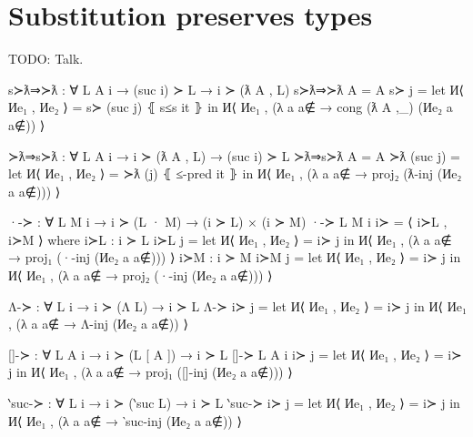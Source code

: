 \documentclass[logo,bsc,singlespacing,parskip,online]{infthesis}
\renewenvironment{code}{\mintedcopy[breaklines,breaksymbolleft=\;]{agda}}{\endmintedcopy}
\begin{document}
\section{Substitution preserves types}
TODO: Talk.
\begin{code}

  s≻ƛ⇒≻ƛ : ∀ {L A i} → (suc i) ≻ L → i ≻ (ƛ A , L)
  s≻ƛ⇒≻ƛ {A = A} s≻ j = let И⟨ Иe₁ , Иe₂ ⟩ = s≻ (suc j) ⦃ s≤s it ⦄
    in И⟨ Иe₁ , (λ a {a∉} → cong (ƛ A ,_) (Иe₂ a {a∉})) ⟩

  ≻ƛ⇒s≻ƛ : ∀ {L A i} → i ≻ (ƛ A , L) → (suc i) ≻ L
  ≻ƛ⇒s≻ƛ {A = A} ≻ƛ (suc j) = let И⟨ Иe₁ , Иe₂ ⟩ = ≻ƛ (j) ⦃ ≤-pred it ⦄
    in И⟨ Иe₁ , (λ a {a∉} → proj₂ (ƛ-inj (Иe₂ a {a∉}))) ⟩

  ·-≻ : ∀ {L M i} → i ≻ (L · M) → (i ≻ L) × (i ≻ M)
  ·-≻ {L} {M} {i} i≻ = ⟨ i≻L , i≻M ⟩
    where
      i≻L : i ≻ L
      i≻L j = let И⟨ Иe₁ , Иe₂ ⟩ = i≻ j
        in И⟨ Иe₁ , (λ a {a∉} → proj₁ (·-inj (Иe₂ a {a∉}))) ⟩
      i≻M : i ≻ M
      i≻M j = let И⟨ Иe₁ , Иe₂ ⟩ = i≻ j
        in И⟨ Иe₁ , (λ a {a∉} → proj₂ (·-inj (Иe₂ a {a∉}))) ⟩

  Λ-≻ : ∀ {L i} → i ≻ (Λ L) → i ≻ L
  Λ-≻ i≻ j = let И⟨ Иe₁ , Иe₂ ⟩ = i≻ j
    in И⟨ Иe₁ , (λ a {a∉} → Λ-inj (Иe₂ a {a∉})) ⟩

  []-≻ : ∀ {L A i} → i ≻ (L [ A ]) → i ≻ L
  []-≻ {L} {A} {i} i≻ j = let И⟨ Иe₁ , Иe₂ ⟩ = i≻ j
    in И⟨ Иe₁ , (λ a {a∉} → proj₁ ([]-inj (Иe₂ a {a∉}))) ⟩

  ‵suc-≻ : ∀ {L i} → i ≻ (‵suc L) → i ≻ L
  ‵suc-≻ i≻ j = let И⟨ Иe₁ , Иe₂ ⟩ = i≻ j
    in И⟨ Иe₁ , (λ a {a∉} → ‵suc-inj (Иe₂ a {a∉})) ⟩
  

\end{code}
\end{document}
